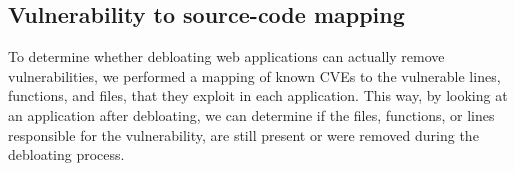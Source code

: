 
\begin{table}[]
\centering
\caption{Analyzed open-source web applications.}
\label{table:analyzed_webapps}
\end{table}

\subsection{Vulnerability to source-code mapping}
\label{sec:vulntosourcemapping}
To determine whether debloating web applications can actually remove
vulnerabilities, we performed a mapping of known CVEs to the vulnerable lines,
functions, and files, that they exploit in each application. This way, by
looking at an application after debloating, we can determine if the files,
functions, or lines responsible for the vulnerability, are still present or
were removed during the debloating process.


